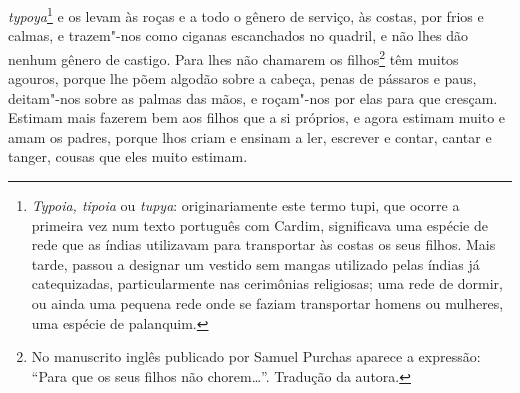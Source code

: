 \textit{typoya}\footnote{ \textit{Typoia, tipoia} ou \textit{tupya}: originariamente
este termo tupi, que ocorre a primeira vez num texto português com
Cardim, significava uma espécie de rede que as índias utilizavam para
transportar às costas os seus filhos. Mais tarde, passou a designar um
vestido sem mangas utilizado pelas índias já catequizadas,
particularmente nas cerimônias religiosas; uma rede de dormir, ou ainda
uma pequena rede onde se faziam transportar homens ou mulheres, uma
espécie de palanquim.} e os levam às roças e a todo o gênero
de serviço, às costas, por frios e calmas, e trazem"-nos como ciganas
escanchados no quadril, e não lhes dão nenhum gênero de castigo. Para
lhes não chamarem os filhos\footnote{ No manuscrito inglês publicado
por Samuel Purchas aparece a expressão: ``Para que os seus filhos não
chorem\ldots{}''. Tradução da autora.} têm muitos agouros, porque lhe põem
algodão sobre a cabeça, penas de pássaros e paus, deitam"-nos sobre as
palmas das mãos, e roçam"-nos por elas para que cresçam. Estimam mais
fazerem bem aos filhos que a si próprios, e agora estimam muito e amam
os padres, porque lhos criam e ensinam a ler, escrever e contar, cantar
e tanger, cousas que eles muito estimam.

